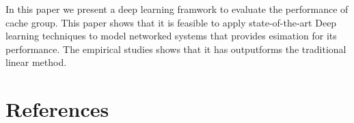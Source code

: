 \documentclass[5p]{elsarticle}
\begin{document}
In this paper we present a deep learning framwork to evaluate the performance of cache group. This paper shows that it is feasible to apply state-of-the-art Deep learning techniques to model networked systems that provides esimation for its performance. The empirical studies shows that it has outputforms the traditional linear method.
\section*{References}



\end{document}
